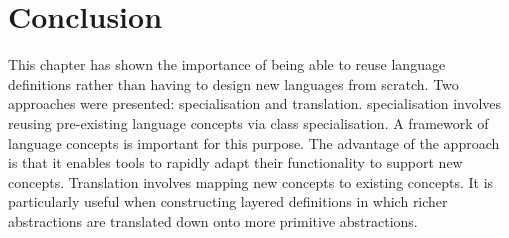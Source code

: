 \section{Conclusion}

This chapter has shown the importance of being able to reuse
language definitions rather than having to design new languages
from scratch. Two approaches were presented: specialisation and
translation. specialisation involves reusing pre-existing language
concepts via class specialisation. A framework of language
concepts is important for this purpose. The advantage of the
approach is that it enables tools to rapidly adapt their
functionality to support new concepts. Translation involves
mapping new concepts to existing concepts. It is particularly
useful when constructing layered definitions in which richer
abstractions are translated down onto more primitive abstractions.
